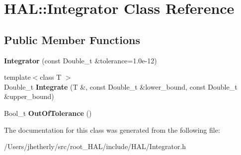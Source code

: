 \hypertarget{class_h_a_l_1_1_integrator}{\section{H\-A\-L\-:\-:Integrator Class Reference}
\label{class_h_a_l_1_1_integrator}
}
\subsection*{Public Member Functions}
\begin{DoxyCompactItemize}
\item 
\hypertarget{class_h_a_l_1_1_integrator_acd878eaa888dfce44a3c1130770a74a5}{{\bfseries Integrator} (const Double\-\_\-t \&tolerance=1.\-0e-\/12)}\label{class_h_a_l_1_1_integrator_acd878eaa888dfce44a3c1130770a74a5}

\item 
\hypertarget{class_h_a_l_1_1_integrator_a5eefbd36726dbcaaabb07cd617799661}{{\footnotesize template$<$class T $>$ }\\Double\-\_\-t {\bfseries Integrate} (T \&, const Double\-\_\-t \&lower\-\_\-bound, const Double\-\_\-t \&upper\-\_\-bound)}\label{class_h_a_l_1_1_integrator_a5eefbd36726dbcaaabb07cd617799661}

\item 
\hypertarget{class_h_a_l_1_1_integrator_ab866da7ce3499bcf3d874fac6ef1e6fc}{Bool\-\_\-t {\bfseries Out\-Of\-Tolerance} ()}\label{class_h_a_l_1_1_integrator_ab866da7ce3499bcf3d874fac6ef1e6fc}

\end{DoxyCompactItemize}


The documentation for this class was generated from the following file\-:\begin{DoxyCompactItemize}
\item 
/\-Users/jhetherly/src/root\-\_\-\-H\-A\-L/include/\-H\-A\-L/Integrator.\-h\end{DoxyCompactItemize}
